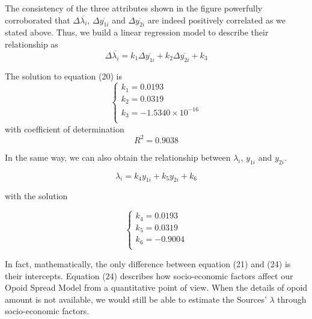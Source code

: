 The consistency of the three attributes shown in the figure powerfully corroborated that $\Delta \overline{\lambda_i}$, $\Delta \overline{y_{1i}}$ and  $\Delta \overline{y_{2i}}$ are indeed positively correlated as we stated above. Thus, we build a linear regression model to describe their relationship as
\begin{equation}
\Delta \overline{\lambda_i} = k_1 \Delta \overline{y_{1i}} + k_2 \Delta \overline{y_{2i}} + k_3
\end{equation}

The solution to equation (20) is
\begin{equation}
\left\{
\begin{array}{l}
k_1 = 0.0193 \\
k_2 = 0.0319 \\
k_3 = -1.5340 \times 10^{-16} \\
\end{array}
\right.
\end{equation}
with coefficient of determination
\begin{equation}
R^2 = 0.9038
\end{equation} 

In the same way, we can also obtain the relationship between $\lambda_i$, $y_{1i}$ and $y_{2i}$. 

\begin{equation}
\lambda_i = k_4 y_{1i}+ k_5 y_{2i} + k_6
\end{equation}

with the solution

\begin{equation}
\left\{
\begin{array}{l}
k_4 = 0.0193 \\
k_5 = 0.0319 \\
k_6 = -0.9004 \\
\end{array}
\right.
\end{equation}

In fact, mathematically, the only difference between equation (21) and (24) is their intercepts.
Equation (24) describes how socio-economic factors affect our Opoid Spread Model from a quantitative point of view. When the details of opoid amount is not available, we would still be able to estimate the Sources' $\lambda$ through socio-economic factors.


